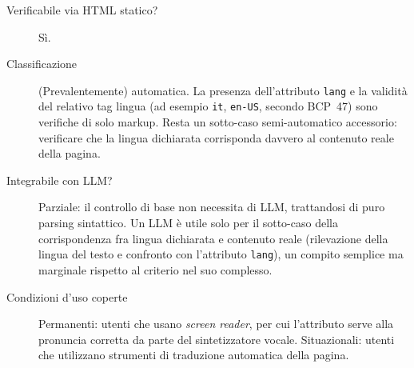 \begin{description}

\item[Verificabile via HTML statico?] Sì.
\item[Classificazione] (Prevalentemente) automatica. La presenza dell'attributo \texttt{lang} e la validità del relativo tag lingua (ad esempio \texttt{it}, \texttt{en-US}, secondo BCP~47) sono verifiche di solo markup. Resta un sotto-caso semi-automatico accessorio: verificare che la lingua dichiarata corrisponda davvero al contenuto reale della pagina.
\item[Integrabile con LLM?] Parziale: il controllo di base non necessita di LLM, trattandosi di puro parsing sintattico. Un LLM è utile solo per il sotto-caso della corrispondenza fra lingua dichiarata e contenuto reale (rilevazione della lingua del testo e confronto con l'attributo \texttt{lang}), un compito semplice ma marginale rispetto al criterio nel suo complesso.

\item[Condizioni d'uso coperte] Permanenti: utenti che usano \emph{screen reader}, per cui l'attributo serve alla pronuncia corretta da parte del sintetizzatore vocale. Situazionali: utenti che utilizzano strumenti di traduzione automatica della pagina.

\end{description}

